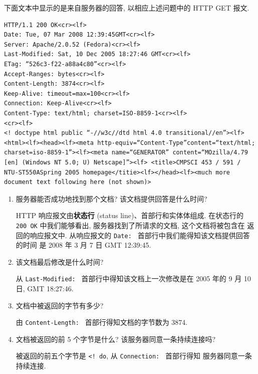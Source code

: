 \documentclass[10pt,UTF8]{ctexbook} %
\begin{document}
\begin{example}
    下面文本中显示的是来自服务器的回答, 以相应上述问题中的 HTTP GET 报文.
    \begin{lstlisting}
HTTP/1.1 200 OK<cr><lf>
Date: Tue, 07 Mar 2008 12:39:45GMT<cr><lf>
Server: Apache/2.0.52 (Fedora)<cr><lf>
Last-Modified: Sat, 10 Dec 2005 18:27:46 GMT<cr><lf>
ETag: “526c3-f22-a88a4c80”<cr><lf>
Accept-Ranges: bytes<cr><lf>
Content-Length: 3874<cr><lf>
Keep-Alive: timeout=max=100<cr><lf>
Connection: Keep-Alive<cr><lf>
Content-Type: text/html; charset=ISO-8859-1<cr><lf>
<cr><lf>
<! doctype html public “-//w3c//dtd html 4.0 transitional//en”><lf><html><lf><head><lf><meta http-equiv=“Content-Type”content=“text/html; charset=iso-8859-1”><lf><meta name=“GENERATOR” content=“MOzilla/4.79 [en] (Windows NT 5.0; U) Netscape]”><lf> <title>CMPSCI 453 / 591 / NTU-ST550ASpring 2005 homepage</titie><lf></head><lf><much more document text following here (not shown)>
    \end{lstlisting}
    \begin{enumerate}[label={\alph*.}, itemsep=0pt]
        \item 服务器能否成功地找到那个文档? 该文档提供回答是什么时间?

        HTTP 响应报文由\textbf{状态行} (status line)、首部行和实体体组成. 在状态行的
        \lstinline|200 OK| 中我们能够看出, 服务器找到了所请求的文档, 这个文档将被包含在
        返回的响应报文中. 从响应报文的 \lstinline|Date: | 首部行中我们能得知该文档提供回答的时间
        是 2008 年 3 月 7 日 GMT 12:39:45.
        \item 该文档最后修改是什么时间?

        从 \lstinline|Last-Modified: | 首部行中得知该文档上一次修改是在 2005 年的 9 月 10 日, GMT 18:27:46.
        \item 文档中被返回的字节有多少?

        由 \lstinline|Content-Length: | 首部行得知文档的字节数为 3874.
        \item 文档被返回的前 5 个字节是什么? 该服务器同意一条持续连接吗?
        
        被返回的前五个字节是 \lstinline|<! do|, 从 \lstinline|Connection: | 首部行得知
        服务器同意一条持续连接.
    \end{enumerate}
\end{example}
\end{document}
